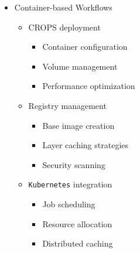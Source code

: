 \documentclass[
]{article}
\providecommand{\tightlist}{%
  \setlength{\itemsep}{0pt}\setlength{\parskip}{0pt}}
\begin{document}
\begin{itemize}
\begin{itemize}
\begin{itemize}
      \begin{itemize}
      \tightlist
      \item
        Build artifact storage
      \item
        Package repository setup
      \item
        Image registry integration
      \end{itemize}
    \item
      Release automation

      \begin{itemize}
      \tightlist
      \item
        Version management
      \item
        Changelog generation
      \item
        Release note automation
      \end{itemize}
    \end{itemize}
  \item
    Container-based Workflows

    \begin{itemize}
    \tightlist
    \item
      CROPS deployment

      \begin{itemize}
      \tightlist
      \item
        Container configuration
      \item
        Volume management
      \item
        Performance optimization
      \end{itemize}
    \item
      Registry management

      \begin{itemize}
      \tightlist
      \item
        Base image creation
      \item
        Layer caching strategies
      \item
        Security scanning
      \end{itemize}
    \item
      \texttt{Kubernetes} integration

      \begin{itemize}
      \tightlist
      \item
        Job scheduling
      \item
        Resource allocation
      \item
        Distributed caching
      \end{itemize}
    \end{itemize}
  \end{itemize}
\end{itemize}
\end{document}
